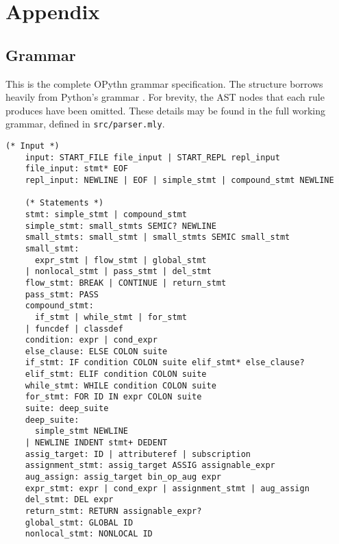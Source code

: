 \documentclass[11pt, twoside]{article}
\newcommand{\ms}{\texttt}
\begin{document}
    \section{Appendix}
    \subsection{Grammar}
    This is the complete OPythn grammar specification. The structure borrows heavily from Python's grammar \cite{pythonref}. For brevity, the AST nodes that each rule produces have been omitted. These details may be found in the full working grammar, defined in \ms{src/parser.mly}.
    \begin{lstlisting}[language=caml]
    (* Input *)
    input: START_FILE file_input | START_REPL repl_input
    file_input: stmt* EOF
    repl_input: NEWLINE | EOF | simple_stmt | compound_stmt NEWLINE
    
    (* Statements *)
    stmt: simple_stmt | compound_stmt
    simple_stmt: small_stmts SEMIC? NEWLINE
    small_stmts: small_stmt | small_stmts SEMIC small_stmt
    small_stmt:
      expr_stmt | flow_stmt | global_stmt
    | nonlocal_stmt | pass_stmt | del_stmt
    flow_stmt: BREAK | CONTINUE | return_stmt
    pass_stmt: PASS
    compound_stmt:
      if_stmt | while_stmt | for_stmt
    | funcdef | classdef
    condition: expr | cond_expr
    else_clause: ELSE COLON suite
    if_stmt: IF condition COLON suite elif_stmt* else_clause?
    elif_stmt: ELIF condition COLON suite
    while_stmt: WHILE condition COLON suite
    for_stmt: FOR ID IN expr COLON suite
    suite: deep_suite
    deep_suite:
      simple_stmt NEWLINE
    | NEWLINE INDENT stmt+ DEDENT
    assig_target: ID | attributeref | subscription
    assignment_stmt: assig_target ASSIG assignable_expr
    aug_assign: assig_target bin_op_aug expr
    expr_stmt: expr | cond_expr | assignment_stmt | aug_assign
    del_stmt: DEL expr
    return_stmt: RETURN assignable_expr?
    global_stmt: GLOBAL ID
    nonlocal_stmt: NONLOCAL ID
    

\end{lstlisting}
\end{document}
